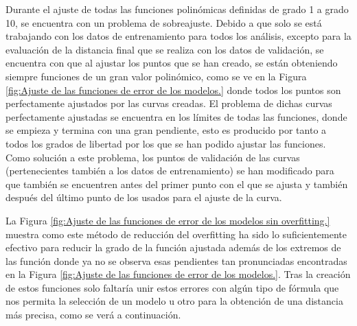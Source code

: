 Durante el ajuste de todas las funciones polinómicas definidas de grado 1 a grado 10, se encuentra con un problema de sobreajuste. Debido a que solo se está trabajando con los datos de entrenamiento para todos los análisis, excepto para la evaluación de la distancia final que se realiza con los datos de validación, se encuentra con que al ajustar los puntos que se han creado, se están obteniendo siempre funciones de un gran valor polinómico, como se ve en la Figura \ref{fig:Ajuste de las funciones de error de los modelos.} donde todos los puntos son perfectamente ajustados por las curvas creadas. El problema de dichas curvas perfectamente ajustadas se encuentra en los límites de todas las funciones, donde se empieza y termina con una gran pendiente, esto es producido por tanto a todos los grados de libertad por los que se han podido ajustar las funciones. Como solución a este problema, los puntos de validación de las curvas (pertenecientes también a los datos de entrenamiento) se han modificado para que también se encuentren antes del primer punto con el que se ajusta y también después del último punto de los usados para el ajuste de la curva.

La Figura \ref{fig:Ajuste de las funciones de error de los modelos sin overfitting.} muestra como este método de reducción del overfitting ha sido lo suficientemente efectivo para reducir la grado de la función ajustada además de los extremos de las función donde ya no se observa esas pendientes tan pronunciadas encontradas en la Figura \ref{fig:Ajuste de las funciones de error de los modelos.}. Tras la creación de estos funciones solo faltaría unir estos errores con algún tipo de fórmula que nos permita la selección de un modelo u otro para la obtención de una distancia más precisa, como se verá a continuación.

